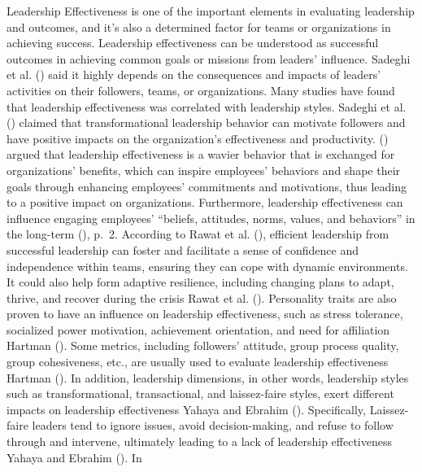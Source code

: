 \documentclass[
  man,
  longtable,
  nolmodern,
  notxfonts,
  notimes,
  colorlinks=true,linkcolor=blue,citecolor=blue,urlcolor=blue]{apa7}
\begin{document}
Leadership Effectiveness is one of the important elements in evaluating
leadership and outcomes, and it's also a determined factor for teams or
organizations in achieving success. Leadership effectiveness can be
understood as successful outcomes in achieving common goals or missions
from leaders' influence. Sadeghi et al.
() said it highly depends on the
consequences and impacts of leaders' activities on their followers,
teams, or organizations. Many studies have found that leadership
effectiveness was correlated with leadership styles. Sadeghi et al.
() claimed that transformational
leadership behavior can motivate followers and have positive impacts on
the organization's effectiveness and productivity.
() argued that
leadership effectiveness is a wavier behavior that is exchanged for
organizations' benefits, which can inspire employees' behaviors and
shape their goals through enhancing employees' commitments and
motivations, thus leading to a positive impact on organizations.
Furthermore, leadership effectiveness can influence engaging employees'
``beliefs, attitudes, norms, values, and behaviors'' in the long-term
(),
p.~2. According to Rawat et al. (),
efficient leadership from successful leadership can foster and
facilitate a sense of confidence and independence within teams, ensuring
they can cope with dynamic environments. It could also help form
adaptive resilience, including changing plans to adapt, thrive, and
recover during the crisis Rawat et al. ().
Personality traits are also proven to have an influence on leadership
effectiveness, such as stress tolerance, socialized power motivation,
achievement orientation, and need for affiliation Hartman
(). Some metrics, including followers'
attitude, group process quality, group cohesiveness, etc., are usually
used to evaluate leadership effectiveness Hartman
(). In addition, leadership dimensions,
in other words, leadership styles such as transformational,
transactional, and laissez-faire styles, exert different impacts on
leadership effectiveness Yahaya and Ebrahim
(). Specifically, Laissez-faire leaders
tend to ignore issues, avoid decision-making, and refuse to follow
through and intervene, ultimately leading to a lack of leadership
effectiveness Yahaya and Ebrahim (). In
\end{document}

